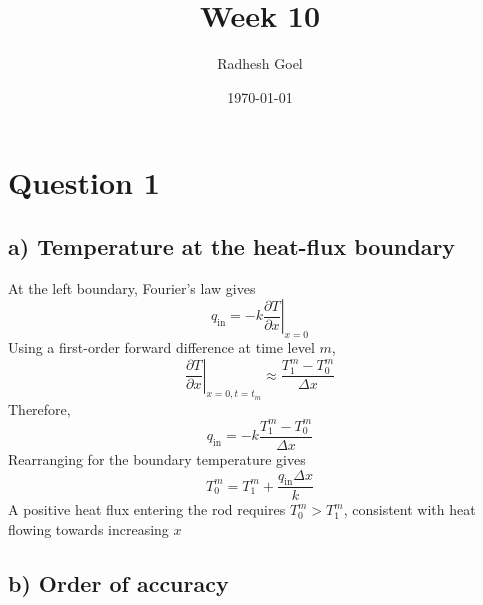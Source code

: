 \documentclass[a4paper]{exam}
\title{Week 10}
\author{Radhesh Goel}
\date{\today}
\begin{document}
\maketitle

\section*{Question 1}

\subsection*{a) Temperature at the heat-flux boundary}

\begin{solution}
  At the left boundary, Fourier's law gives
  \[
    q_{\mathrm{in}} = -k\left. \frac{\partial T}{\partial x} \right|_{x=0}
  \]
  Using a first-order forward difference at time level \(m\),
  \[
    \left. \frac{\partial T}{\partial x} \right|_{x=0,t=t_m} \approx \frac{T_1^m - T_0^m}{\Delta x}
  \]
  Therefore,
  \[
    q_{\mathrm{in}} = -k\frac{T_1^m - T_0^m}{\Delta x}
  \]
  Rearranging for the boundary temperature gives
  \[
    \boxed{T_0^m=T_1^m+\frac{q_{\mathrm{in}}\Delta x}{k}}
  \]
  A positive heat flux entering the rod requires \(T_0^m > T_1^m\), consistent
  with heat flowing towards increasing \(x\)
\end{solution}

\subsection*{b) Order of accuracy}
\end{document}
